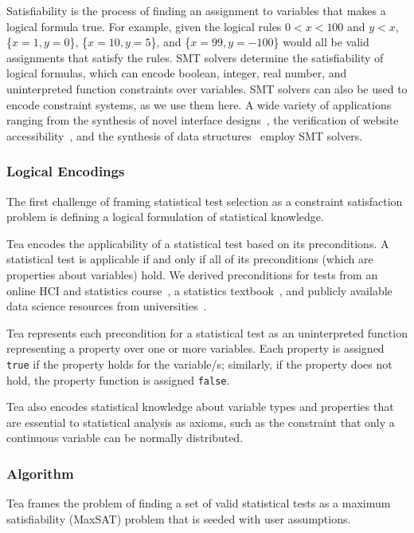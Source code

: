 Satisfiability is the process of finding an assignment to variables that makes a
logical formula true. For example, given the logical rules $0 < x < 100$ and $y
< x$, \{$x = 1, y = 0$\}, \{$x = 10, y = 5$\}, and \{$x = 99, y = -100$\} would all be
valid assignments that satisfy the rules. SMT solvers determine the
satisfiability of logical formulas, which can encode boolean, integer, real
number, and uninterpreted function constraints over variables. SMT solvers can also
be used to encode constraint systems, as we use them here. A wide variety of 
applications ranging from the synthesis of novel interface
designs~\cite{swearngin2018scout}, the verification of website
accessibility~\cite{panchekha2018verifying}, and the synthesis of data
structures~\cite{loncaric2016cozy} employ SMT solvers. 

\subsubsection{Logical Encodings}
The first challenge of framing statistical test selection as a constraint satisfaction
problem is defining a logical formulation of statistical
knowledge.

Tea encodes the applicability of a statistical test based on its preconditions.
A statistical test is applicable if and only if all of its preconditions (which
are properties about variables) hold. We derived preconditions for tests
from an online HCI and statistics course~\cite{klemmerCoursera}, a statistics
textbook~\cite{field2012discoveringR}, and publicly available data science
resources from universities~\cite{ucla:whatstat, kent:tutorials}.

Tea represents each precondition for a statistical test as an uninterpreted
function representing a property over one or more variables. Each property is
assigned \texttt{true} if the property holds for the variable/s; similarly, if the
property does not hold, the property function is assigned \texttt{false}.

Tea also encodes statistical knowledge about variable types and properties that
are essential to statistical analysis as axioms, such as the constraint that only a
continuous variable can be normally distributed.

\subsubsection{Algorithm}
Tea frames the problem of finding a set of valid statistical tests as a maximum
satisfiability (MaxSAT) problem that is seeded with user assumptions.

